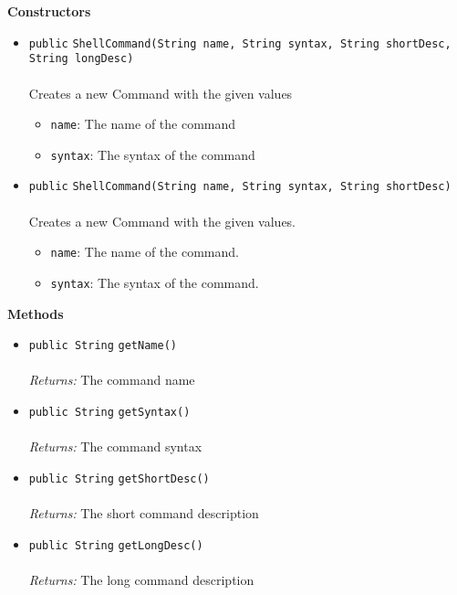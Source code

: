\textbf{\sffamily Constructors}
\begin{itemize}
\item \lstinline|public| \lstinline|ShellCommand|\lstinline|(String name, String syntax, String shortDesc, String longDesc)|\\ \\[-0.6em]
Creates a new Command with the given values
\begin{itemize}
\item \lstinline|name|: The name of the command
\item \lstinline|syntax|: The syntax of the command
\end{itemize}



\item \lstinline|public| \lstinline|ShellCommand|\lstinline|(String name, String syntax, String shortDesc)|\\ \\[-0.6em]
Creates a new Command with the given values.
\begin{itemize}
\item \lstinline|name|: The name of the command.
\item \lstinline|syntax|: The syntax of the command.
\end{itemize}



\end{itemize}


\textbf{\sffamily Methods}
\begin{itemize}
\item \lstinline|public String| \lstinline|getName|\lstinline|()|\\ \\[-0.6em]
\emph{Returns:} The command name



\item \lstinline|public String| \lstinline|getSyntax|\lstinline|()|\\ \\[-0.6em]
\emph{Returns:} The command syntax



\item \lstinline|public String| \lstinline|getShortDesc|\lstinline|()|\\ \\[-0.6em]
\emph{Returns:} The short command description



\item \lstinline|public String| \lstinline|getLongDesc|\lstinline|()|\\ \\[-0.6em]
\emph{Returns:} The long command description



\end{itemize}

